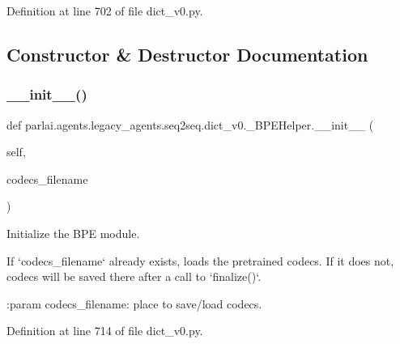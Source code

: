 Definition at line 702 of file dict\+\_\+v0.\+py.



\subsection{Constructor \& Destructor Documentation}
\mbox{\label{classparlai_1_1agents_1_1legacy__agents_1_1seq2seq_1_1dict__v0_1_1__BPEHelper_aef7e3f8a0917447dc3c30fba14803466}} 
\subsubsection{\texorpdfstring{\+\_\+\+\_\+init\+\_\+\+\_\+()}{\_\_init\_\_()}}
{\footnotesize\ttfamily def parlai.\+agents.\+legacy\+\_\+agents.\+seq2seq.\+dict\+\_\+v0.\+\_\+\+B\+P\+E\+Helper.\+\_\+\+\_\+init\+\_\+\+\_\+ (\begin{DoxyParamCaption}\item[{}]{self,  }\item[{}]{codecs\+\_\+filename }\end{DoxyParamCaption})}

\begin{DoxyVerb}Initialize the BPE module.

If `codecs_filename` already exists, loads the pretrained codecs.
If it does not, codecs will be saved there after a call to `finalize()`.

:param codecs_filename: place to save/load codecs.
\end{DoxyVerb}
 

Definition at line 714 of file dict\+\_\+v0.\+py.


